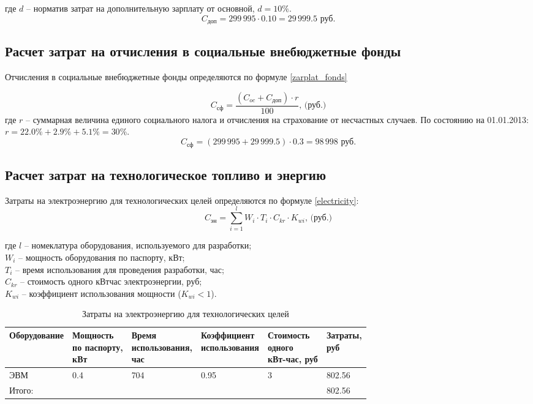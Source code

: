 где $d$ – норматив затрат на дополнительную зарплату от основной, $d=10\%$.
$$
	C_\textit{доп}  = 299\,995 \cdot 0.10 = 29\,999.5 \mbox{ руб.}
$$

\subsection{Расчет затрат на отчисления в социальные внебюджетные фонды}
Отчисления в социальные внебюджетные фонды определяются по формуле \ref{zarplat_fonds}

\begin{equation}
	C_\textit{сф} = \frac{(C_{oc} + C_\textit{доп}) \cdot r}{100} \mbox{, (руб.)}
	\label{zarplat_fonds}
\end{equation} 
где $r$ – суммарная величина единого социального налога  и отчисления на страхование от несчастных случаев. По состоянию на 01.01.2013: $r = 22.0\%	+ 2.9\% + 5.1\% = 30\%$.
$$
	C_\textit{сф} = (299\,995 + 29\,999.5)\cdot 0.3 = 98\,998 \mbox{ руб.}
$$

\subsection{Расчет затрат на технологическое топливо и энергию}
Затраты на электроэнергию для технологических целей определяются по формуле \ref{electricity}:
\begin{equation}
	C_\textit{эн} = \sum_{i=1}^l W_i \cdot T_i \cdot C_{kr} \cdot K_{wi} \mbox{, (руб.)}
	\label{electricity}
\end{equation}

где  $l$ – номеклатура оборудования, используемого для разработки;\\
$W_i$ – мощность оборудования по паспорту, кВт;\\
$T_i$ – время использования для проведения разработки, час;\\
$C_{kr}$ – стоимость одного кВт\textperiodcentered час электроэнергии, руб;\\
$K_{wi}$ – коэффициент использования мощности ($K_{wi} < 1$).\\

\begin{table}[h]
	\caption{Затраты на электроэнергию для технологических целей}
	\begin{tabular}{|l|l|l|l|l|l|}
		\hline
			Оборудование & \thead{Мощность\\ по паспорту,\\кВт} & \thead{Время\\использования,\\час} & \thead{Коэффициент\\использования} & \thead{Стоимость\\одного\\кВт-час, руб} &  \thead{Затраты,\\руб} \\
		\hline
			ЭВМ & 0.4 & 704 & 0.95 & 3 & 802.56 \\
		\hline
			Итого: & & & & & 802.56 \\
		\hline		
	\end{tabular}
\end{table}

